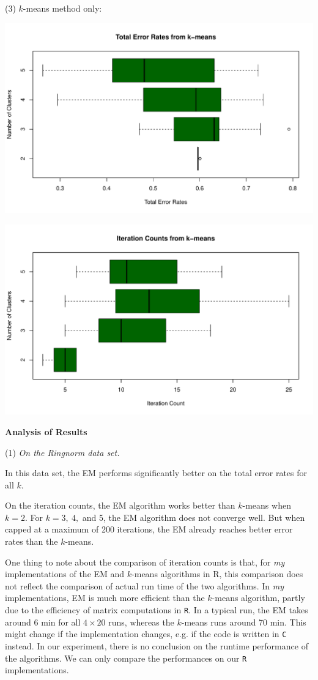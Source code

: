 \documentclass[a4paper,12pt]{article}
\newcommand{\code}[1]{\texttt{#1}}
\newcommand{\km}{$k$-means }
\begin{document}
\noindent (3) $k$-means method only:
\begin{center}
  \includegraphics[width=0.8\linewidth]{Image/Prob3-TotalErr-Ionosphere-kmeans.pdf}
\end{center}
\begin{center}
  \includegraphics[width=0.8\linewidth]{Image/Prob3-ItrCount-Ionosphere-kmeans.pdf}
\end{center}




\bigskip
\begin{center}
    \textcolor{mydarkgreen}{\textbf{Analysis of Results}}
\end{center}

\noindent 
(1) \emph{On the Ringnorm data set.}

In this data set, the EM performs significantly better on the total error rates for all $k$.

On the iteration counts, the EM algorithm works better than $k$-means when $k=2$. For $k=3,\ 4,$ and 5, the EM algorithm does not converge well. But when capped at a maximum of 200 iterations, the EM already reaches better error rates than the $k$-means.

One thing to note about the comparison of iteration counts is that, for \emph{my} implementations of the EM and $k$-means algorithms in R, this comparison does not reflect the comparison of actual run time of the two algorithms. In \emph{my} implementations, EM is much more efficient than the \km algorithm, partly due to the efficiency of matrix computations in \code{R}. In a typical run, the EM takes around 6 min for all $4\times 20$ runs, whereas the \km runs around 70 min. This might change if the implementation changes, e.g. if the code is written in \code{C} instead. In our experiment, there is no conclusion on the runtime performance of the algorithms. We can only compare the performances on our \code{R} implementations.
\bigskip\bigskip
\end{document}
